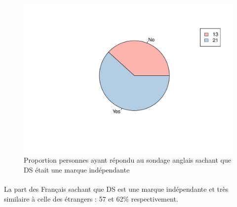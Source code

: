 \documentclass[12pt]{article}\usepackage[]{graphicx}\usepackage[]{color}
\makeatletter
\def\maxwidth{ %
  \ifdim\Gin@nat@width>\linewidth
    \linewidth
  \else
    \Gin@nat@width
  \fi
}
\newenvironment{knitrout}{}{} %
\makeatother
\begin{document}
\begin{knitrout}
\color{fgcolor}\begin{figure}[H]
\includegraphics[width=\maxwidth]{figure/ds_know_en-1} \caption[Proportion personnes ayant répondu au sondage anglais sachant que DS était une marque indépendante]{Proportion personnes ayant répondu au sondage anglais sachant que DS était une marque indépendante}\label{fig:ds know en}
\end{figure}


\end{knitrout}

\paragraph{} La part des Français sachant que DS est une marque indépendante et
très similaire à celle des étrangers : 57 et 62\% respectivement.
\end{document}
